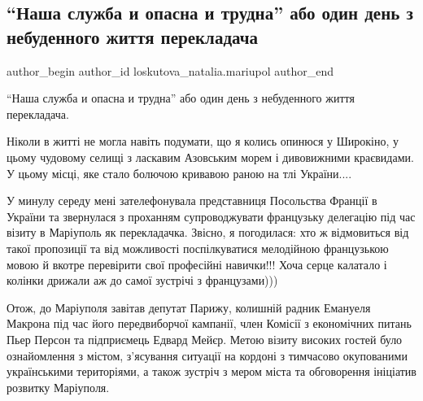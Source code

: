 
 
 
 
 

\subsection{\enquote{Наша служба и опасна и трудна} або один день з небуденного життя перекладача}
\label{sec:20_06_2021.fb.loskutova_natalia.mariupol.1._nasha_sluzhba_i_opa}

\ifcmt
 author_begin
   author_id loskutova_natalia.mariupol
 author_end
\fi


\enquote{Наша служба и опасна и трудна} або один день з небуденного життя перекладача.

Ніколи в житті не могла навіть подумати, що я колись опинюся у Широкіно, у
цьому чудовому селищі з ласкавим Азовським морем і дивовижними краєвидами. У
цьому місці, яке стало болючою кривавою раною на тлі України.... 

У минулу середу мені зателефонувала представниця Посольства Франції в України
та звернулася з проханням супроводжувати французьку делегацію під час візиту в
Маріуполь як перекладачка. Звісно, я погодилася: хто ж відмовиться від такої
пропозиції та від можливості поспілкуватися мелодійною французькою мовою й
вкотре перевірити свої професійні навички!!! Хоча серце калатало і колінки
дрижали аж до самої зустрічі з французами))) 


Отож, до Маріуполя завітав депутат Парижу, колишній радник Емануеля Макрона під
час його передвиборчої кампанії, член Комісії з економічних питань Пьер Персон
та підприємець Едвард Мейєр. Метою візиту високих гостей було ознайомлення з
містом, з'ясування ситуації на кордоні з тимчасово окупованими українськими
територіями, а також зустріч з мером міста та обговорення ініціатив розвитку
Маріуполя. 

